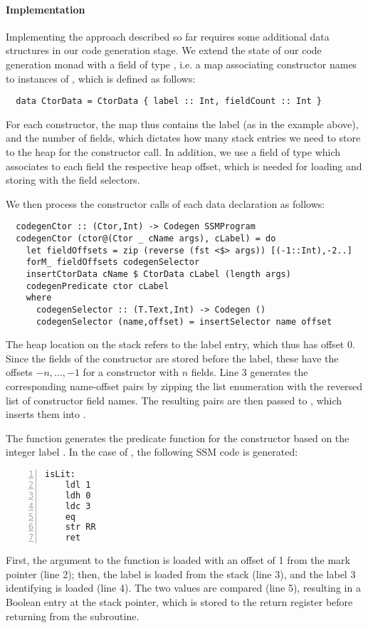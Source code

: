 \paragraph{Implementation}
Implementing the approach described so far requires some additional data
structures in our code generation stage. We extend the state of our code
generation monad with a field  of type ,
i.e. a map associating constructor names to instances of ,
which is defined as follows:
\begin{verbatim}
  data CtorData = CtorData { label :: Int, fieldCount :: Int }
\end{verbatim}
%
For each constructor, the map thus contains the label (as in the example above),
and the number of fields, which dictates how many stack entries we need to store
to the heap for the constructor call.
In addition, we use a field  of type 
which associates to each field the respective heap offset, which is needed for
loading and storing with the field selectors.

We then process the constructor calls of each data declaration as follows:
\begin{verbatim}
  codegenCtor :: (Ctor,Int) -> Codegen SSMProgram
  codegenCtor (ctor@(Ctor _ cName args), cLabel) = do
    let fieldOffsets = zip (reverse (fst <$> args)) [(-1::Int),-2..]
    forM_ fieldOffsets codegenSelector
    insertCtorData cName $ CtorData cLabel (length args)
    codegenPredicate ctor cLabel
    where
      codegenSelector :: (T.Text,Int) -> Codegen ()
      codegenSelector (name,offset) = insertSelector name offset
\end{verbatim}

The heap location on the stack refers to the label entry, which thus has offset
0. Since the fields of the constructor are stored before the label, these have
the offsets $-n,\dots,-1$ for a constructor with $n$ fields.
Line 3 generates the corresponding name-offset pairs by zipping the list
enumeration \haskell{[-1,-2..]} with the reversed list of constructor field
names. The resulting pairs are then passed to , which
inserts them into .

The function  generates the predicate function for the
constructor  based on the integer label . In the case
of , the following SSM code is generated:
\begin{lstlisting}[numbers=left]
  isLit:
    ldl 1
    ldh 0
    ldc 3
    eq
    str RR
    ret
\end{lstlisting}
%
First, the argument to the function is loaded with an offset of 1 from the mark
pointer (line 2); then, the label is loaded from the stack (line 3), and the
label 3 identifying  is loaded (line 4).
The two values are compared (line 5), resulting in a Boolean entry at the stack
pointer, which is stored to the return register before returning from the
subroutine.



